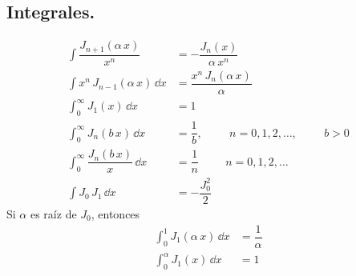 \subsection{Integrales.}
\begin{align*}
\int \dfrac{J_{n+1} (\alpha \, x)}{x^{n}} &= - \dfrac{J_{n}(x)}{\alpha \, x^{n}} \\[1em]
\int x^{n} \, J_{n-1} (\alpha \, x) \, \dd x &= \dfrac{x^{n} \, J_{n}(\alpha \, x)}{\alpha} \\[1em]
\int_{0}^{\infty} J_{1}(x) \, \dd x &= 1 \\[1em]
\int_{0}^{\infty} J_{n} (b \, x) \, \dd x &= \dfrac{1}{b}, \hspace{1cm} n = 0, 1, 2, \ldots, \hspace{1cm} b > 0 \\[1em]
\int_{0}^{\infty} \dfrac{J_{n} (b \, x)}{x} \, \dd x &= \dfrac{1}{n} \hspace{1cm} n = 0, 1, 2, \ldots \\[1em]
\int J_{0} \, J_{1} \, \dd x &= - \dfrac{J_{0}^{2}}{2}
\end{align*}
Si $\alpha$ es raíz de $J_{0}$, entonces
\begin{align*}
\int_{0}^{1} J_{1} (\alpha \, x) \, \dd x &= \dfrac{1}{\alpha} \\[1em]
\int_{0}^{\alpha} J_{1} (x) \, \dd x &= 1
\end{align*}
